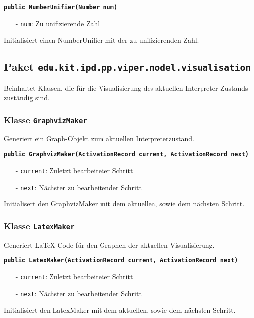 \documentclass[parskip=full,11pt,twoside]{scrartcl}
\begin{document}
\textbf{\texttt{public NumberUnifier(Number num)}}
\begin{itemize}[noitemsep]
	\item[-] \texttt{num}: Zu unifizierende Zahl
\end{itemize}
Initialisiert einen NumberUnifier mit der zu unifizierenden Zahl.

\newpage
\subsection{Paket \texttt{edu.kit.ipd.pp.viper.model.visualisation}}

Beinhaltet Klassen, die für die Visualisierung des aktuellen Interpreter-Zustands zuständig sind.

\subsubsection{Klasse \texttt{GraphvizMaker}}

Generiert ein Graph-Objekt zum aktuellen Interpreterzustand.

\textbf{\texttt{public GraphvizMaker(ActivationRecord current, ActivationRecord next)}}
\begin{itemize}[noitemsep]
	\item[-] \texttt{current}: Zuletzt bearbeiteter Schritt
    \item[-] \texttt{next}: Nächster zu bearbeitender Schritt
\end{itemize}
Initialisert den GraphvizMaker mit dem aktuellen, sowie dem nächsten Schritt.

\subsubsection{Klasse \texttt{LatexMaker}}

Generiert LaTeX-Code für den Graphen der aktuellen Visualisierung.

\textbf{\texttt{public LatexMaker(ActivationRecord current, ActivationRecord next)}}
\begin{itemize}[noitemsep]
	\item[-] \texttt{current}: Zuletzt bearbeiteter Schritt
    \item[-] \texttt{next}: Nächster zu bearbeitender Schritt
\end{itemize}
Initialisiert den LatexMaker mit dem aktuellen, sowie dem nächsten Schritt.
\end{document}
